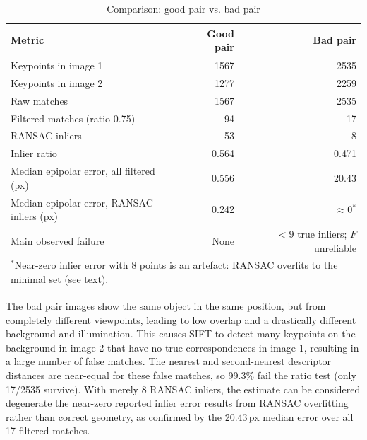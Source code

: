 \documentclass[10pt,a4paper]{article}
\begin{document}
\vspace{-0.3em}
\begin{table}[H]
\centering\small
\vspace{-0.3em}
\caption{Comparison: good pair vs. bad pair}
\vspace{-0.3em}
\begin{tabular}{lrr}
\toprule
Metric & Good pair & Bad pair \\
\midrule
Keypoints in image 1 & 1567 & 2535 \\
Keypoints in image 2 & 1277 & 2259 \\
Raw matches & 1567 & 2535 \\
Filtered matches (ratio 0.75) & 94 & 17 \\
RANSAC inliers & 53 & 8 \\
Inlier ratio & 0.564 & 0.471 \\
Median epipolar error, all filtered (px) & 0.556 & 20.43 \\
Median epipolar error, RANSAC inliers (px) & 0.242 & $\approx$0$^{*}$ \\
Main observed failure & None & $<$9 true inliers; $F$ unreliable \\
\bottomrule
\multicolumn{3}{l}{\footnotesize $^{*}$Near-zero inlier error with 8 points is
  an artefact: RANSAC overfits to the minimal set (see text).}
\end{tabular}
\end{table}
\vspace{-0.3em}

The bad pair images show the same object in the same position, but from completely different viewpoints, leading to 
low overlap and a drastically different background and illumination. This causes SIFT to detect many keypoints on the background in image 2 that have no true correspondences in image 1, resulting in a large number of false matches.
The nearest and second-nearest descriptor
distances are near-equal for these false matches, so 99.3\% fail the ratio test
(only 17/2535 survive).
With merely 8 RANSAC inliers, the estimate can be considered degenerate the near-zero reported inlier error results
from RANSAC overfitting rather than correct geometry, as confirmed by the
20.43\,px median error over all 17 filtered matches.

\end{document}

